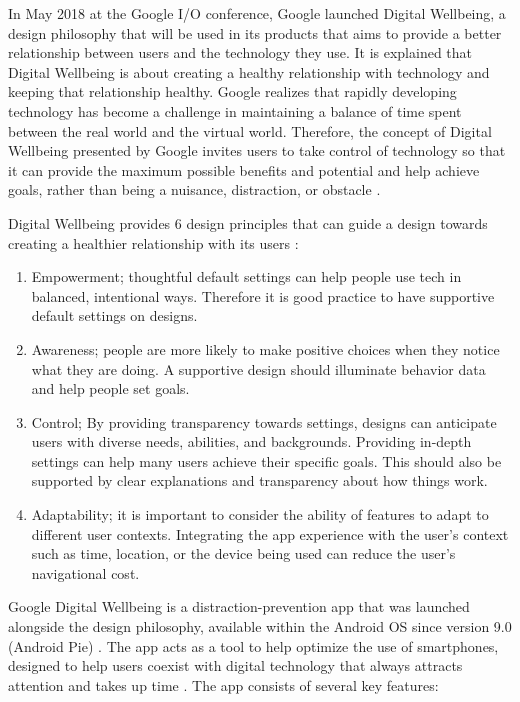 \documentclass[conference]{IEEEtran}
\begin{document}
In May 2018 at the Google I/O conference, Google launched Digital Wellbeing, a design philosophy that will be used in its products that aims to provide a better relationship between users and the technology they use. It is explained that Digital Wellbeing is about creating a healthy relationship with technology and keeping that relationship healthy. Google realizes that rapidly developing technology has become a challenge in maintaining a balance of time spent between the real world and the virtual world. Therefore, the concept of Digital Wellbeing presented by Google invites users to take control of technology so that it can provide the maximum possible benefits and potential and help achieve goals, rather than being a nuisance, distraction, or obstacle \cite{google2019dwcourse}.

Digital Wellbeing provides 6 design principles that can guide a design towards creating a healthier relationship with its users \cite{google2021dwframework}:

\begin{enumerate}
  \item Empowerment; thoughtful default settings can help people use tech in balanced, intentional ways. Therefore it is good practice to have supportive default settings on designs.

  \item Awareness; people are more likely to make positive choices when they notice what they are doing. A supportive design should illuminate behavior data and help people set goals.

  \item Control; By providing transparency towards settings, designs can anticipate users with diverse needs, abilities, and backgrounds. Providing in-depth settings can help many users achieve their specific goals. This should also be supported by clear explanations and transparency about how things work.

  \item Adaptability; it is important to consider the ability of features to adapt to different user contexts. Integrating the app experience with the user's context such as time, location, or the device being used can reduce the user's navigational cost.

\end{enumerate}

Google Digital Wellbeing is a distraction-prevention app that was launched alongside the design philosophy, available within the Android OS since version 9.0 (Android Pie) \cite{google2021dwsupport}. The app acts as a tool to help optimize the use of smartphones, designed to help users coexist with digital technology that always attracts attention and takes up time \cite{8976353}. The app consists of several key features:
\end{document}
